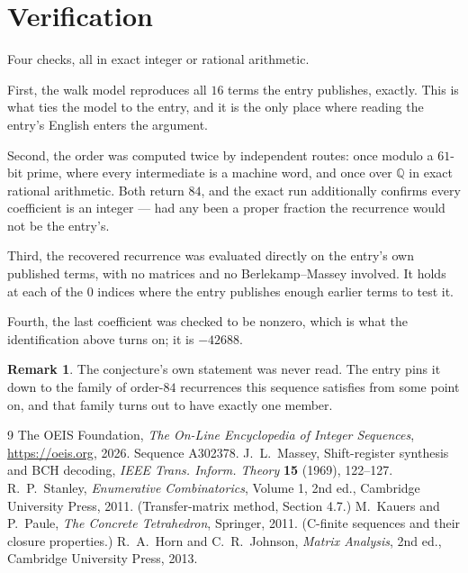 \documentclass[11pt,a4paper]{article}
\theoremstyle{plain}
\theoremstyle{definition}
\newtheorem{remark}[theorem]{Remark}
\begin{document}
\section{Verification}

Four checks, all in exact integer or rational arithmetic.

First, the walk model reproduces all $16$ terms the entry publishes, exactly. This is
what ties the model to the entry, and it is the only place where reading the entry's English
enters the argument.

Second, the order was computed twice by independent routes: once modulo a $61$-bit prime, where
every intermediate is a machine word, and once over $\mathbb{Q}$ in exact rational arithmetic.
Both return $84$, and the exact run additionally confirms every coefficient is an integer
--- had any been a proper fraction the recurrence would not be the entry's.

Third, the recovered recurrence was evaluated directly on the entry's own published terms, with
no matrices and no Berlekamp--Massey involved. It holds at each of the $0$ indices where
the entry publishes enough earlier terms to test it.

Fourth, the last coefficient was checked to be nonzero, which is what the identification above
turns on; it is $-42688$.

\begin{remark}
The conjecture's own statement was never read. The entry pins it down to the family of
order-$84$ recurrences this sequence satisfies from some point on, and that family turns
out to have exactly one member.
\end{remark}

\begin{thebibliography}{9}
 The OEIS Foundation, \emph{The On-Line Encyclopedia of Integer
Sequences}, \url{https://oeis.org}, 2026. Sequence A302378.
 J.~L.~Massey, Shift-register synthesis and BCH decoding, \emph{IEEE
Trans. Inform. Theory} \textbf{15} (1969), 122--127.
 R.~P.~Stanley, \emph{Enumerative Combinatorics}, Volume 1, 2nd ed.,
Cambridge University Press, 2011. (Transfer-matrix method, Section 4.7.)
 M.~Kauers and P.~Paule, \emph{The Concrete Tetrahedron}, Springer, 2011.
(C-finite sequences and their closure properties.)
 R.~A.~Horn and C.~R.~Johnson, \emph{Matrix Analysis}, 2nd ed., Cambridge
University Press, 2013.
\end{thebibliography}
\end{document}

